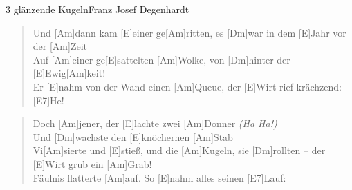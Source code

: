 \begin{song}{3 glänzende Kugeln}{Franz Josef Degenhardt}

    \begin{verse}  
        Und [Am]dann kam [E]einer ge[Am]ritten, es [Dm]war in dem [E]Jahr vor der [Am]Zeit \\
        Auf [Am]einer ge[E]sattelten [Am]Wolke, von [Dm]hinter der [E]Ewig[Am]keit! \\
        Er [E]nahm von der Wand einen [Am]Queue, der [E]Wirt rief krächzend: [E7]He!
    \end{verse}  


    \begin{verse}  
        Doch [Am]jener, der [E]lachte zwei [Am]Donner \textit{(Ha Ha!)} \\
        Und [Dm]wachste den [E]knöchernen [Am]Stab \\
        Vi[Am]sierte und [E]stieß, und die [Am]Kugeln, sie [Dm]rollten – der [E]Wirt grub ein [Am]Grab! \\
        [E]Fäulnis flatterte [Am]auf. So [E]nahm alles seinen [E7]Lauf:
    \end{verse}  

\end{song}

